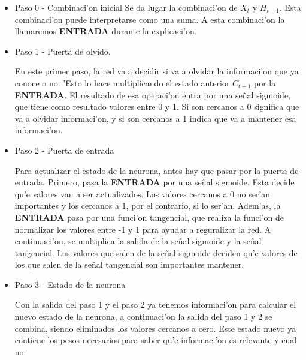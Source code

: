 \begin{itemize}
\item Paso 0 - Combinaci'on inicial
Se da lugar la combinaci'on de $  X_{t} $ y $ H_{t-1} $. Esta combinaci'on puede interpretarse como una suma. A esta combinaci'on la llamaremos \textbf{ENTRADA} durante la explicaci'on.


\item Paso 1 - Puerta de olvido.  

En este primer paso, la red va a decidir si va a olvidar la informaci'on que ya conoce o no. 'Esto lo hace multiplicando el estado anterior $ C_{t-1} $ por la \textbf{ENTRADA}. El resultado de esa operaci'on entra por una señal sigmoide, que tiene como resultado valores entre 0 y 1. Si son cercanos a 0 significa que va a olvidar informaci'on, y si son cercanos a 1 indica que va a mantener esa informaci'on.



\item Paso 2 - Puerta de entrada  

Para actualizar el estado de la neurona, antes hay que pasar por la puerta de entrada.  
Primero, pasa la \textbf{ENTRADA} por una señal sigmoide. Esta decide qu'e valores van a ser actualizados. Los valores cercanos a 0 no ser'an importantes y los cercanos a 1, por el contrario, si lo ser'an. Adem'as, la \textbf{ENTRADA} pasa por una funci'on tangencial, que realiza la funci'on de normalizar los valores entre -1 y 1 para ayudar a reguralizar la red. A continuaci'on, se multiplica la salida de la señal sigmoide y la señal tangencial. Los valores que salen de la señal sigmoide deciden qu'e valores de los que salen de la señal tangencial son importantes mantener.

\clearpage

\item Paso 3 - Estado de la neurona  

Con la salida del paso 1 y el paso 2 ya tenemos informaci'on para calcular el nuevo estado de la neurona, a continuaci'on la salida del paso 1 y 2 se combina, siendo eliminados los valores cercanos a cero. Este estado nuevo ya contiene los pesos necesarios para saber qu'e informaci'on es relevante y cual no.




\end{itemize}
